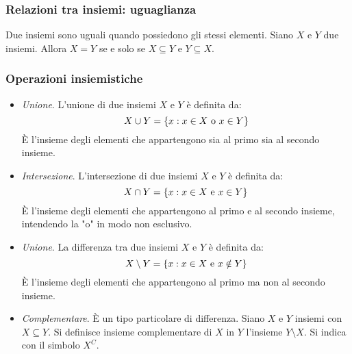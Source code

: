 \documentclass[11pt]{book}
\begin{document}
\subsubsection*{Relazioni tra insiemi: uguaglianza}
Due insiemi sono uguali quando possiedono gli stessi elementi.
Siano $X$ e $Y$ due insiemi. Allora $X=Y$ se e solo se $X\subseteq Y$ e $Y\subseteq X$.
\subsubsection*{Operazioni insiemistiche}
\begin{itemize}
    \item \textit{Unione}. L'unione di due insiemi $X$ e $Y$ è definita da:
    \begin{equation*}
        X\cup Y=\{x:x\in X \textnormal{ o } x\in Y\}
    \end{equation*}
    È l'insieme degli elementi che appartengono sia al primo sia al secondo insieme.
    \item \textit{Intersezione}. L'intersezione di due insiemi $X$ e $Y$ è definita da:
    \begin{equation*}
        X\cap Y=\{x:x\in X \textnormal{ e } x\in Y\}
    \end{equation*}
    È l'insieme degli elementi che appartengono al primo e al secondo insieme, intendendo la "o" in modo non esclusivo.
    \item \textit{Unione}. La differenza tra due insiemi $X$ e $Y$ è definita da:
    \begin{equation*}
        X\setminus Y=\{x:x\in X \textnormal{ e } x\notin Y\}
    \end{equation*}
    È l'insieme degli elementi che appartengono al primo ma non al secondo insieme.
    \item \textit{Complementare}. È un tipo particolare di differenza. Siano $X$ e $Y$ insiemi con $X\subseteq Y$. Si 
    definisce insieme complementare di $X$ in $Y$ l'insieme $Y\setminus X$. Si indica con il simbolo $X^C$.
\end{itemize}
\end{document}
